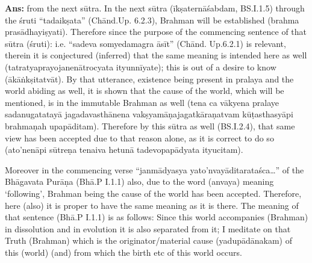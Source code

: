 \textbf{Ans:} from the next sūtra. In the next sūtra (īkṣaternāśabdam, BS.I.1.5) through the śruti “tadaikṣata” (Chānd.Up. 6.2.3), Brahman will be established (brahma prasādhayiṣyati).  Therefore since the purpose of the commencing sentence of that sūtra (śruti): i.e. “sadeva somyedamagra āsīt” (Chānd. Up.6.2.1) is relevant, therein it is conjectured (inferred) that the same meaning is intended here as well (tatratyaprayojanenātrocyata ityunnīyate); this is out of a desire to know (ākāṅkṣitatvāt). By that utterance, existence being present in pralaya and the world abiding as well, it is shown that the cause of the world, which will be mentioned, is in the immutable Brahman as well (tena ca vākyena pralaye sadanugatatayā jagadavasthānena vakṣyamāṇajagatkāraṇatvam kūṭasthasyāpi brahmaṇah upapāditam). Therefore by this sūtra as well (BS.I.2.4), that same view has been accepted due to that reason alone, as it is correct to do so (ato’nenāpi sūtreṇa tenaiva hetunā tadevopapādyata ityucitam).

Moreover in the commencing verse “janmādyasya yato’nvayāditarata\-śca…” of the Bhāgavata Purāṇa (Bhā.P I.1.1) also, due to the word (anvaya) meaning ‘following’, Brahman being the cause of the world has been accepted. Therefore, here (also) it is proper to have the same meaning as it is there. The meaning of that sentence (Bhā.P I.1.1) is as follows:  Since this world accompanies (Brahman) in dissolution and in evolution it is also separated from it; I meditate on that Truth (Brahman) which is the originator/material cause (yadupādānakam) of this (world) (and) from which the birth etc of this world occurs.   

